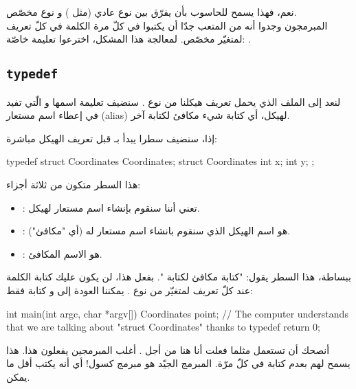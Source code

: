 نعم، فهذا يسمح للحاسوب بأن يفرّق بين نوع عادي (مثل
)
و نوع مخصّص.\\
المبرمجون وجدوا أنه من المتعب جدّا أن يكتبوا في كلّ مرة الكلمة
في كلّ تعريف لمتغيّر مخصّص.
لمعالجة هذا المشكل، اخترعوا تعليمة خاصّة: .

\subsection{\texttt{typedef}}

لنعد إلى الملف
الذي يحمل تعريف هيكلنا من نوع
.
سنضيف تعليمة اسمها
و الّتي تفيد في إعطاء اسم مستعار
(\textenglish{alias})
لهيكل، أي كتابة شيء مكافئ لكتابة آخر.

إذا، سنضيف سطرا يبدأ بـ
قبل تعريف الهيكل مباشرة:

\begin{Csource}
typedef struct Coordinates Coordinates;
struct Coordinates
{
	int x;
	int y;
};
\end{Csource}

هذا السطر متكون من ثلاثة أجزاء:

\begin{itemize}
  \item {}:
  تعني أننا سنقوم بإنشاء اسم مستعار لهيكل.
  \item {}:
  هو اسم الهيكل الذي سنقوم بانشاء اسم مستعار له (أي "مكافئ").
  \item {}:
  هو الاسم المكافئ.
\end{itemize}

ببساطة، هذا السطر يقول: "كتابة
مكافئ لكتابة
".
بفعل هذا، لن يكون عليك كتابة الكلمة
عند كلّ تعريف لمتغيّر من نوع
.
يمكننا العودة إلى
و كتابة فقط:

\begin{Csource}
int main(int argc, char *argv[])
{
	 Coordinates point; // The computer understands that we are talking about "struct Coordinates" thanks to typedef
   return 0;
}
\end{Csource}

أنصحك أن تستعمل 
مثلما فعلت أنا هنا من أجل
.
أغلب المبرمجين يفعلون هذا. هذا يسمح لهم بعدم كتابة
في كلّ مرّة. المبرمج الجيّد هو مبرمج كسول! أي أنه يكتب أقل ما يمكن.

